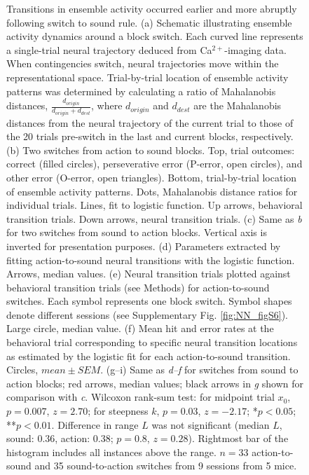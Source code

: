 \begin{figure}[htbp]
\caption[Ensemble activity transitioned earlier and more abruptly following switch to sound rule]
{Transitions in ensemble activity occurred earlier and more abruptly following switch to sound rule. (a) Schematic illustrating ensemble activity dynamics around a block switch. Each curved line represents a single-trial neural trajectory deduced from Ca$^{2+}$-imaging data. When contingencies switch, neural trajectories move within the representational space. Trial-by-trial location of ensemble activity patterns was determined by calculating a ratio of Mahalanobis distances, $\frac{d_{origin}}{d_{origin} + d_{dest}}$, where $d_{origin}$ and $d_{dest}$ are the Mahalanobis distances from the neural trajectory of the current trial to those of the 20 trials pre-switch in the last and current blocks, respectively. (b) Two switches from action to sound blocks. Top, trial outcomes: correct (filled circles), perseverative error (P-error, open circles), and other error (O-error, open triangles). Bottom, trial-by-trial location of ensemble activity patterns. Dots, Mahalanobis distance ratios for individual trials. Lines, fit to logistic function. Up arrows, behavioral transition trials. Down arrows, neural transition trials. (c) Same as \emph{b} for two switches from sound to action blocks. Vertical axis is inverted for presentation purposes. (d) Parameters extracted by fitting action-to-sound neural transitions with the logistic function. Arrows, median values. (e) Neural transition trials plotted against behavioral transition trials (see Methods) for action-to-sound switches. Each symbol represents one block switch. Symbol shapes denote different sessions (see Supplementary Fig. \ref{fig:NN_figS6}). Large circle, median value. (f) Mean hit and error rates at the behavioral trial corresponding to specific neural transition locations as estimated by the logistic fit for each action-to-sound transition. Circles, $\mathit{mean}\pm\mathit{SEM}$. (g–i) Same as \emph{d--f} for switches from sound to action blocks; red arrows, median values; black arrows in \emph{g} shown for comparison with \emph{c}. Wilcoxon rank-sum test: for midpoint trial $x_0$, $p = 0.007$, $z = 2.70$; for steepness $k$, $p = 0.03$, $z = -2.17$; *$p < 0.05$; **$p < 0.01$. Difference in range $L$ was not significant (median $L$, sound: 0.36, action: 0.38; $p = 0.8$, $z = 0.28$). Rightmost bar of the histogram includes all instances above the range. $n = 33$ action-to-sound and 35 sound-to-action switches from 9 sessions from 5 mice.}

\label{fig:NN_fig4}
\end{figure}